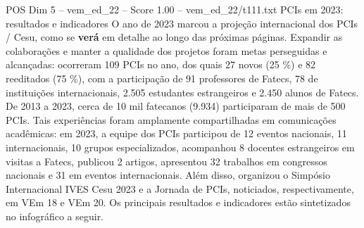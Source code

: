 \begin{textsample}{POS Dim 5 – vem\_ed\_22 – Score 1.00 – vem\_ed\_22/t111.txt}  \label{ex:f5_pos_096}
PCIs em 2023: resultados e indicadores O ano de 2023 marcou a projeção internacional dos PCIs / Cesu, como se \textbf{verá} em detalhe ao longo das próximas páginas.
Expandir as colaborações e manter a qualidade dos projetos foram metas perseguidas e alcançadas: ocorreram 109 PCIs no ano, dos quais 27 novos (25 \%) e 82 reeditados (75 \%), com a participação de 91 professores de Fatecs, 78 de instituições internacionais, 2.505 estudantes estrangeiros e 2.450 alunos de Fatecs.
De 2013 a 2023, cerca de 10 mil fatecanos (9.934) participaram de mais de 500 PCIs.
Tais experiências foram amplamente compartilhadas em comunicações acadêmicas: em 2023, a equipe dos PCIs participou de 12 eventos nacionais, 11 internacionais, 10 grupos especializados, acompanhou 8 docentes estrangeiros em visitas a Fatecs, publicou 2 artigos, apresentou 32 trabalhos em congressos nacionais e 31 em eventos internacionais.
Além disso, organizou o Simpósio Internacional IVES Cesu 2023 e a Jornada de PCIs, noticiados, respectivamente, em VEm 18 e VEm 20.
Os principais resultados e indicadores estão sintetizados no infográfico a seguir.

\end{textsample}
